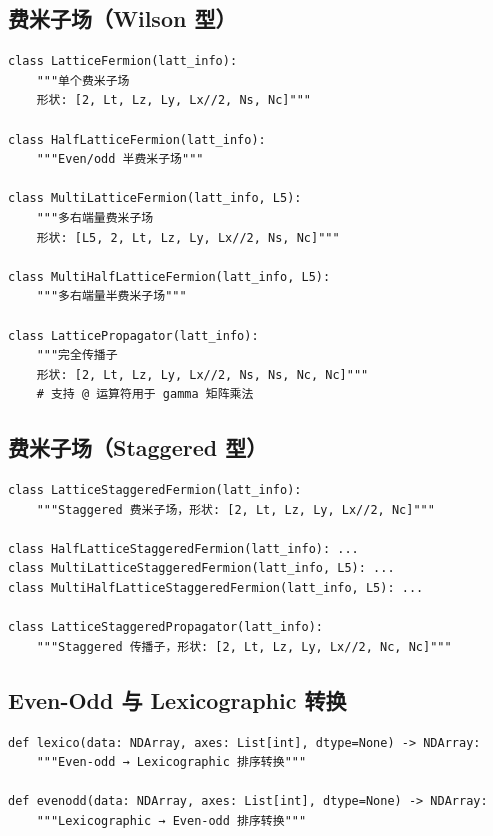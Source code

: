 \documentclass[12pt,a4paper]{ctexart}
\begin{document}
\subsection{费米子场（Wilson 型）}

\begin{lstlisting}[style=pycode]
class LatticeFermion(latt_info):
    """单个费米子场
    形状: [2, Lt, Lz, Ly, Lx//2, Ns, Nc]"""

class HalfLatticeFermion(latt_info):
    """Even/odd 半费米子场"""

class MultiLatticeFermion(latt_info, L5):
    """多右端量费米子场
    形状: [L5, 2, Lt, Lz, Ly, Lx//2, Ns, Nc]"""

class MultiHalfLatticeFermion(latt_info, L5):
    """多右端量半费米子场"""

class LatticePropagator(latt_info):
    """完全传播子
    形状: [2, Lt, Lz, Ly, Lx//2, Ns, Ns, Nc, Nc]"""
    # 支持 @ 运算符用于 gamma 矩阵乘法
\end{lstlisting}

\subsection{费米子场（Staggered 型）}

\begin{lstlisting}[style=pycode]
class LatticeStaggeredFermion(latt_info):
    """Staggered 费米子场，形状: [2, Lt, Lz, Ly, Lx//2, Nc]"""

class HalfLatticeStaggeredFermion(latt_info): ...
class MultiLatticeStaggeredFermion(latt_info, L5): ...
class MultiHalfLatticeStaggeredFermion(latt_info, L5): ...

class LatticeStaggeredPropagator(latt_info):
    """Staggered 传播子，形状: [2, Lt, Lz, Ly, Lx//2, Nc, Nc]"""
\end{lstlisting}

\subsection{Even-Odd 与 Lexicographic 转换}

\begin{lstlisting}[style=pycode]
def lexico(data: NDArray, axes: List[int], dtype=None) -> NDArray:
    """Even-odd → Lexicographic 排序转换"""

def evenodd(data: NDArray, axes: List[int], dtype=None) -> NDArray:
    """Lexicographic → Even-odd 排序转换"""
\end{lstlisting}
\end{document}
